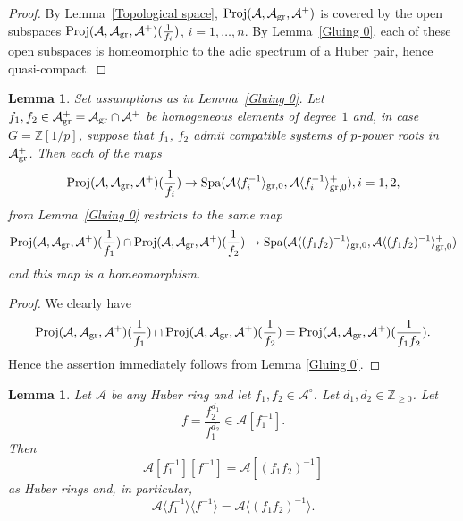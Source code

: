 \documentclass[12pt,twoside,a4paper]{article}
\newtheorem{lemma}[thm]{Lemma}
\theoremstyle{definition}
\theoremstyle{remark}
\newcommand\gr{{\rm gr}}
\newcommand\Proj{{\rm Proj}}
\newcommand\Spa{{\rm Spa}}
\begin{document}
\begin{proof}By Lemma~\ref{Topological space}, $\Proj(\mathcal{A}, \mathcal{A}_{\gr}, \mathcal{A}^{+})$ is covered by the open subspaces $\Proj(\mathcal{A}, \mathcal{A}_{\gr}, \mathcal{A}^{+})(\frac{1}{f_{i}})$, $i=1,\dots, n$. By Lemma~\ref{Gluing 0}, each of these open subspaces is homeomorphic to the adic spectrum of a Huber pair, hence quasi-compact. \end{proof}
\begin{lemma}\label{Gluing 1}Set assumptions as in Lemma~\ref{Gluing 0}. Let $f_1, f_2\in \mathcal{A}_{\gr}^{+}=\mathcal{A}_{\gr}\cap \mathcal{A}^{+}$ be homogeneous elements of degree~$1$ and, in case $G=\mathbb{Z}[1/p]$, suppose that $f_{1}$, $f_{2}$ admit compatible systems of $p$-power roots in $\mathcal{A}_{\gr}^{+}$. Then each of the maps \begin{equation*}\Proj(\mathcal{A}, \mathcal{A}_{\gr}, \mathcal{A}^{+})(\frac{1}{f_i})\to \Spa(\mathcal{A}\langle f_{i}^{-1}\rangle_{\gr, 0}, \mathcal{A}\langle f_{i}^{-1}\rangle_{\gr, 0}^{+}), i=1, 2,\end{equation*}from Lemma~\ref{Gluing 0} restricts to the same map \begin{equation*}\Proj(\mathcal{A}, \mathcal{A}_{\gr}, \mathcal{A}^{+})(\frac{1}{f_1})\cap \Proj(\mathcal{A}, \mathcal{A}_{\gr}, \mathcal{A}^{+})(\frac{1}{f_2})\to \Spa(\mathcal{A}\langle (f_{1}f_{2})^{-1}\rangle_{\gr, 0}, \mathcal{A}\langle (f_{1}f_{2})^{-1}\rangle_{\gr, 0}^{+})\end{equation*}and this map is a homeomorphism.\end{lemma}
\begin{proof}We clearly have \begin{equation*}\Proj(\mathcal{A}, \mathcal{A}_{\gr}, \mathcal{A}^{+})(\frac{1}{f_{1}})\cap \Proj(\mathcal{A}, \mathcal{A}_{\gr}, \mathcal{A}^{+})(\frac{1}{f_2})=\Proj(\mathcal{A}, \mathcal{A}_{\gr}, \mathcal{A}^{+})(\frac{1}{f_{1}f_{2}}).\end{equation*}Hence the assertion immediately follows from Lemma \ref{Gluing 0}.\end{proof}
\begin{lemma}\label{Gluing 1, part 2}Let $\mathcal{A}$ be any Huber ring and let $f_1, f_2\in \mathcal{A}^{\circ}$. Let $d_1, d_2\in \mathbb{Z}_{\geq0}$. Let \begin{equation*}f=\frac{f_{2}^{d_{1}}}{f_{1}^{d_{2}}}\in \mathcal{A}[f_{1}^{-1}].\end{equation*}Then \begin{equation*}\mathcal{A}[f_{1}^{-1}][f^{-1}]=\mathcal{A}[(f_{1}f_{2})^{-1}]\end{equation*}as Huber rings and, in particular,
\begin{equation*}\mathcal{A}\langle f_{1}^{-1}\rangle\langle f^{-1}\rangle=\mathcal{A}\langle (f_{1}f_{2})^{-1}\rangle.\end{equation*}\end{lemma}
\end{document}
